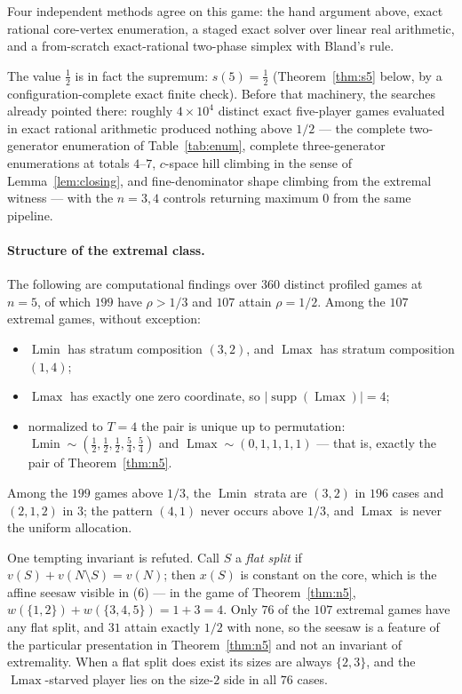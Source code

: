 \documentclass[11pt]{article}
\newcommand{\Lmin}{\operatorname{Lmin}}
\newcommand{\Lmax}{\operatorname{Lmax}}
\newcommand{\supp}{\operatorname{supp}}
\begin{document}
Four independent methods agree on this game: the hand argument above, exact
rational core-vertex enumeration, a staged exact solver over linear real
arithmetic, and a from-scratch exact-rational two-phase simplex with Bland's
rule.

The value $\tfrac12$ is in fact the supremum: $s(5)=\tfrac12$
(Theorem~\ref{thm:s5} below, by a configuration-complete exact finite
check).  Before that machinery, the searches already pointed there: roughly
$4\times10^4$ distinct exact five-player games evaluated in
exact rational arithmetic produced nothing above $1/2$ --- the complete
two-generator enumeration of Table~\ref{tab:enum}, complete three-generator
enumerations at totals $4$--$7$, $c$-space hill climbing in the sense of
Lemma~\ref{lem:closing}, and fine-denominator shape climbing from the
extremal witness --- with the $n=3,4$ controls returning maximum $0$ from
the same pipeline.

\paragraph{Structure of the extremal class.}
The following are computational findings over $360$ distinct profiled games
at $n=5$, of which $199$ have $\rho>1/3$ and $107$ attain $\rho=1/2$.  Among
the $107$ extremal games, without exception:
\begin{itemize}[nosep]
\item $\Lmin$ has stratum composition $(3,2)$, and $\Lmax$ has stratum
      composition $(1,4)$;
\item $\Lmax$ has exactly one zero coordinate, so $|\supp(\Lmax)|=4$;
\item normalized to $T=4$ the pair is unique up to permutation:
      $\Lmin\sim(\tfrac12,\tfrac12,\tfrac12,\tfrac54,\tfrac54)$ and
      $\Lmax\sim(0,1,1,1,1)$ --- that is, exactly the pair of
      Theorem~\ref{thm:n5}.
\end{itemize}
Among the $199$ games above $1/3$, the $\Lmin$ strata are $(3,2)$ in $196$
cases and $(2,1,2)$ in $3$; the pattern $(4,1)$ never occurs above $1/3$, and
$\Lmax$ is never the uniform allocation.

One tempting invariant is refuted.  Call $S$ a \emph{flat split} if
$v(S)+v(N\setminus S)=v(N)$; then $x(S)$ is constant on the core, which is
the affine seesaw visible in (6) --- in the game of Theorem~\ref{thm:n5},
$w(\{1,2\})+w(\{3,4,5\})=1+3=4$.  Only $76$ of the $107$ extremal games have
any flat split, and $31$ attain exactly $1/2$ with none, so the seesaw is a
feature of the particular presentation in Theorem~\ref{thm:n5} and not an
invariant of extremality.  When a flat split does exist its sizes are always
$\{2,3\}$, and the $\Lmax$-starved player lies on the size-$2$ side in all
$76$ cases.
\end{document}
